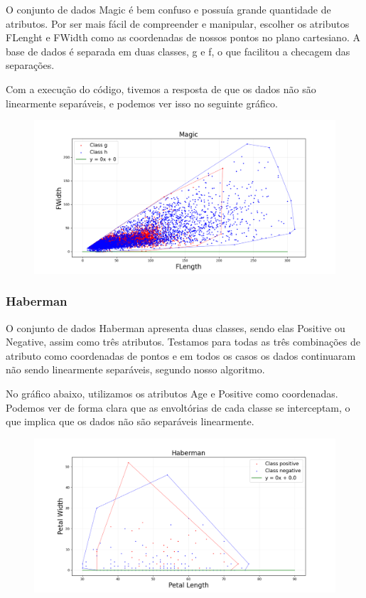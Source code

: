 \documentclass{article}
\begin{document}
O conjunto de dados Magic é bem confuso e possuía grande quantidade de atributos. Por ser mais fácil de compreender e manipular, escolher os atributos FLenght e FWidth como as coordenadas de nossos pontos no plano cartesiano. A base de dados é separada em duas classes, g e f, o que facilitou a checagem das separações.

Com a execução do código, tivemos a resposta de que os dados não são linearmente separáveis, e podemos ver isso no seguinte gráfico.

\begin{figure} [H]
	\includegraphics[width=12cm]{magic.png}
	\centering
\end{figure}

\subsubsection{Haberman}

O conjunto de dados Haberman apresenta duas classes, sendo elas Positive ou Negative, assim como três atributos. Testamos para todas as três combinações de atributo como coordenadas de pontos e em todos os casos os dados continuaram não sendo linearmente separáveis, segundo nosso algoritmo.

No gráfico abaixo, utilizamos os atributos Age e Positive como coordenadas. Podemos ver de forma clara que as envoltórias de cada classe se interceptam, o que implica que os dados não são separáveis linearmente.

\begin{figure} [H]
	\includegraphics[width=12cm]{haberman.png}
	\centering
\end{figure}
\end{document}
